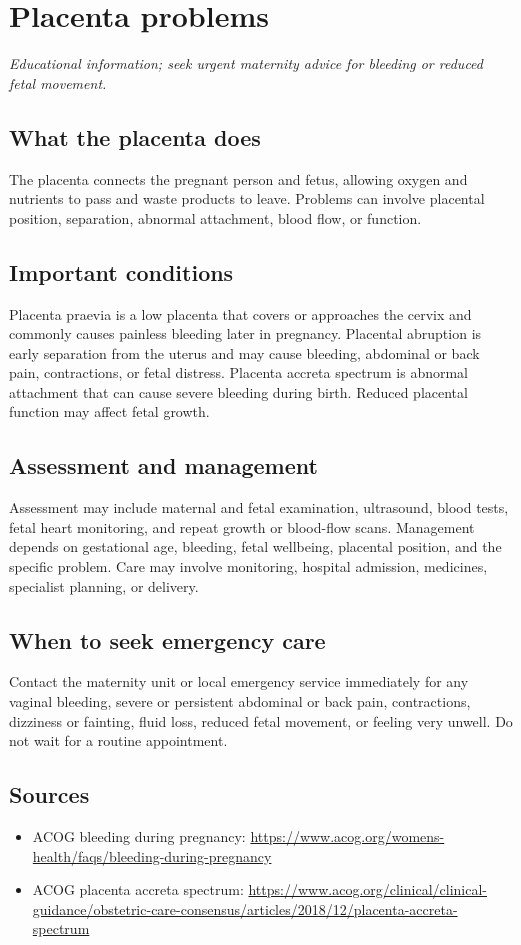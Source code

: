 \chapter{Placenta problems}

\medskip
\noindent\textit{Educational information; seek urgent maternity advice for bleeding or reduced fetal movement.}

\section*{What the placenta does}
The placenta connects the pregnant person and fetus, allowing oxygen and nutrients to pass and waste products to leave. Problems can involve placental position, separation, abnormal attachment, blood flow, or function.

\section*{Important conditions}
Placenta praevia is a low placenta that covers or approaches the cervix and commonly causes painless bleeding later in pregnancy. Placental abruption is early separation from the uterus and may cause bleeding, abdominal or back pain, contractions, or fetal distress. Placenta accreta spectrum is abnormal attachment that can cause severe bleeding during birth. Reduced placental function may affect fetal growth.

\section*{Assessment and management}
Assessment may include maternal and fetal examination, ultrasound, blood tests, fetal heart monitoring, and repeat growth or blood-flow scans. Management depends on gestational age, bleeding, fetal wellbeing, placental position, and the specific problem. Care may involve monitoring, hospital admission, medicines, specialist planning, or delivery.

\section*{When to seek emergency care}
Contact the maternity unit or local emergency service immediately for any vaginal bleeding, severe or persistent abdominal or back pain, contractions, dizziness or fainting, fluid loss, reduced fetal movement, or feeling very unwell. Do not wait for a routine appointment.

\section*{Sources}
\begin{itemize}
\item ACOG bleeding during pregnancy: \url{https://www.acog.org/womens-health/faqs/bleeding-during-pregnancy}
\item ACOG placenta accreta spectrum: \url{https://www.acog.org/clinical/clinical-guidance/obstetric-care-consensus/articles/2018/12/placenta-accreta-spectrum}
\end{itemize}
